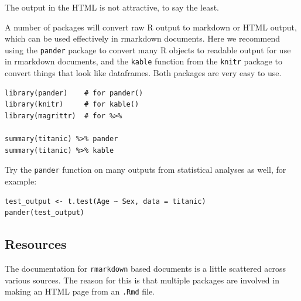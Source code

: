 \documentclass[]{book}
\begin{document}
The output in the HTML is not attractive, to say the least.

A number of packages will convert raw R output to markdown or HTML output, which can be used effectively in rmarkdown documents. Here we recommend using the \texttt{pander} package to convert many R objects to readable output for use in rmarkdown documents, and the \texttt{kable} function from the \texttt{knitr} package to convert things that look like dataframes. Both packages are very easy to use.

\begin{verbatim}
library(pander)    # for pander()
library(knitr)     # for kable()
library(magrittr)  # for %>%

summary(titanic) %>% pander
summary(titanic) %>% kable
\end{verbatim}

Try the \texttt{pander} function on many outputs from statistical analyses as well, for example:

\begin{verbatim}
test_output <- t.test(Age ~ Sex, data = titanic)
pander(test_output)
\end{verbatim}

\hypertarget{rmarkdownresources}{%
\subsection{Resources}\label{rmarkdownresources}}

The documentation for \texttt{rmarkdown} based documents is a little scattered across various sources. The reason for this is that multiple packages are involved in making an HTML page from an \texttt{.Rmd} file.
\end{document}

